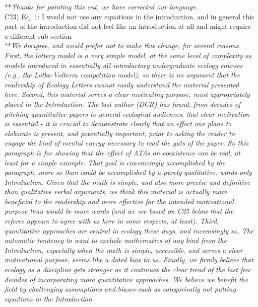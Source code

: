 \documentclass[letterpaper,11pt]{article}
\begin{document}
\noindent ***\emph{Thanks for pointing this out, we have corrected our language.} \\

\noindent C23) Eq. 1: I would not use any equations in the introduction, and in general this part of the introduction did not feel like an introduction at all and might require a different sub-section \\

\noindent ***\emph{We disagree, and would prefer not to make this change, for several reasons. 
First, the lottery model is a very simple model, at the same level of complexity
as models introduced in essentially all introductory 
undergraduate ecology courses (e.g., the Lotka-Volterra competition model), so there is no argument that 
the readership of Ecology Letters cannot easily understand the material presented here.
Second, this material serves a clear motivating purpose, most appropriately placed in the Introduction. 
The last author (DCR) has found, from decades of pitching 
quantitative papers to general ecological audiences, that clear motivation is essential - it is crucial to demonstrate 
clearly that an effect one plans to elaborate is present, and potentially important, prior to asking the reader to engage 
the kind of mental energy necessary to read the guts of the paper. So this 
paragraph is for showing that the effect of ATAs on coexistence can be real, at least for a simple 
example. That goal is convincingly 
accomplished by the paragraph, more so than could be accomplished by a purely qualitative, words-only Introduction. 
Given that the math is simple, and also more precise and definitive than 
qualitative verbal arguments, we think this material is actually
more beneficial to the readership and more effective for the intended motivational purpose than would be more words
(and we see based on C25 below that the referee appears to agree with us here in some respects, at least). 
Third, quantitative approaches are central in ecology these days, and increasingly so. The automatic tendency
to want to exclude mathematics of any kind from the Introduction, especially when the math is simple,
accessible, and serves a clear motivational purpose, seems like a dated bias to us. 
Finally, we firmly believe that ecology as a discipline gets stronger as it continues the clear
trend of the last few decades of incorporating more quantitative approaches. We believe we
benefit the field by challenging assumptions and biases such as categorically not putting equations 
in the Introduction.} \\
\end{document}
